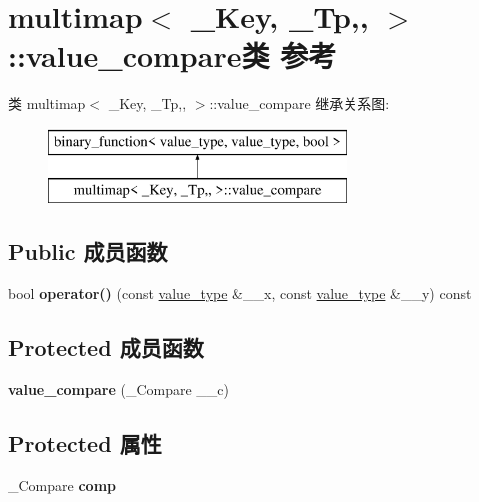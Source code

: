 \hypertarget{classmultimap_1_1value__compare}{}\section{multimap$<$ \+\_\+\+Key, \+\_\+\+Tp,, $>$\+:\+:value\+\_\+compare类 参考}
\label{classmultimap_1_1value__compare}
类 multimap$<$ \+\_\+\+Key, \+\_\+\+Tp,, $>$\+:\+:value\+\_\+compare 继承关系图\+:\begin{figure}[H]
\begin{center}
\leavevmode
\includegraphics[height=2.000000cm]{classmultimap_1_1value__compare}
\end{center}
\end{figure}
\subsection*{Public 成员函数}
\begin{DoxyCompactItemize}
\item 
\mbox{\label{classmultimap_1_1value__compare_ae827fce636c5475b89183083e9fdf5db}} 
bool {\bfseries operator()} (const \hyperlink{structpair}{value\+\_\+type} \&\+\_\+\+\_\+x, const \hyperlink{structpair}{value\+\_\+type} \&\+\_\+\+\_\+y) const
\end{DoxyCompactItemize}
\subsection*{Protected 成员函数}
\begin{DoxyCompactItemize}
\item 
\mbox{\label{classmultimap_1_1value__compare_a115dab1d6f9f0a5d5955d70e992409e7}} 
{\bfseries value\+\_\+compare} (\+\_\+\+Compare \+\_\+\+\_\+c)
\end{DoxyCompactItemize}
\subsection*{Protected 属性}
\begin{DoxyCompactItemize}
\item 
\mbox{\label{classmultimap_1_1value__compare_a2389cfb72e2a47e2d2eaaa4d33b7cf72}} 
\+\_\+\+Compare {\bfseries comp}
\end{DoxyCompactItemize}
